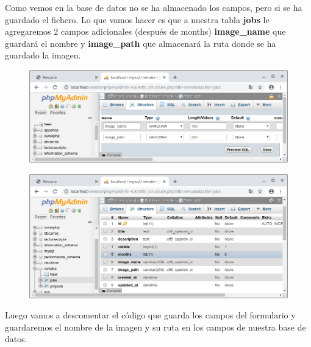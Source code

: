 \documentclass{article}
\begin{document}
Como vemos en la base de datos no se ha almacenado los campos, pero si se ha
guardado el fichero. Lo que vamos hacer es que a nuestra tabla \textbf{jobs} le
agregaremos 2 campos adicionales (después de months) \textbf{image\_name} que
guardará el nombre y \textbf{image\_path} que almacenará la ruta donde se ha
guardado la imagen.\\

\newpage

\begin{figure}[h!]
  \centering
  \includegraphics[scale=0.5]{./Pictures/184_filename_db.png}
\end{figure}

\begin{figure}[h!]
  \centering
  \includegraphics[scale=0.5]{./Pictures/185_bd.png}
\end{figure}

Luego vamos a descomentar el código que guarda los campos del formulario y
guardaremos el nombre de la imagen y su ruta en los campos de nuestra base de
datos. \\
\end{document}
